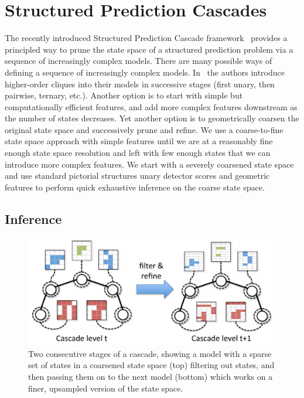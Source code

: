 \section{Structured Prediction Cascades} \label{sec:SPC}
The recently introduced Structured Prediction Cascade framework~\cite{cascades} 
provides a principled way to prune the state space of a structured prediction 
problem via a sequence of increasingly complex models.
There are many possible ways of defining a sequence of increasingly complex 
models.  In~\cite{cascades} the authors introduce higher-order cliques into 
their models in successive stages (first unary, then pairwise, ternary, etc.).  
Another option is to start with simple but computationally efficient features, 
and add more complex features downstream as the number of states decreases.  
Yet another option is to geometrically coarsen the original state space and 
successively prune and refine.
 We use a coarse-to-fine state space approach with simple features until we are 
at a reasonably fine enough state space resolution and left with few enough 
states that we can introduce more complex features.  We start with a severely 
coarsened state space and use standard pictorial structures unary detector 
scores and geometric features to perform quick exhaustive inference on the 
coarse state space.  

\subsection{Inference}
\begin{figure}[tb]
\begin{center}
\includegraphics[width=0.99\textwidth]{figs/cascade-concept.pdf}
\caption[Intermediate cascade filtering/refinement step.]{Two consecutive stages of a cascade, showing a model with a sparse set of states in a coarsened state space (top) filtering out states, and then passing them on to the next model (bottom) which works on a finer, upsampled version of the state space.}
\label{fig:cascade-concept}
\end{center}
\end{figure}


